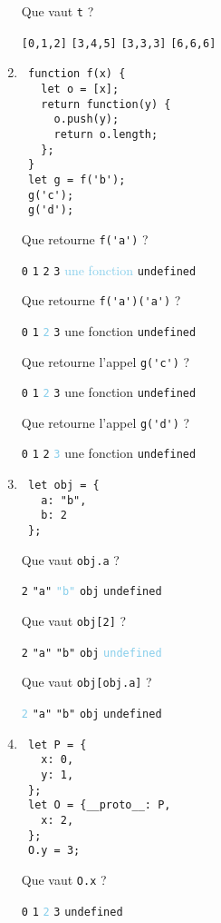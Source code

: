 \documentclass[a4paper, 12pt]{article}
\newcommand{\choice}[1]{\Square\hspace{2pt} #1\hspace{5pt}}
\newcommand{\choicec}[1]{\Square\hspace{2pt} \lstinline{#1}\hspace{5pt}}
\newcommand{\fullpoint}[1]{\textcolor{RubineRed}{#1}}
\newcommand{\halfpoint}[1]{\textcolor{SkyBlue}{#1}}
\newcommand{\choicegh}[1]{\halfpoint{\XBox\hspace{2pt} #1\hspace{5pt}}}
\newcommand{\choicecg}[1]{\fullpoint{\XBox\hspace{2pt} \lstinline{#1}\hspace{5pt}}}
\newcommand{\choicecgh}[1]{\halfpoint{\XBox\hspace{2pt} \lstinline{#1}\hspace{5pt}}}
\begin{document}
\begin{enumerate}
  Que vaut \lstinline{t} ?

  \choicec{[0,1,2]} \choicec{[3,4,5]} \choicec{[3,3,3]} \choicecg{[6,6,6]}

\item \lstset{language=javascript}
\begin{lstlisting}
 function f(x) {
   let o = [x];
   return function(y) {
     o.push(y);
     return o.length;
   };
 }
 let g = f('b');
 g('c');
 g('d');
\end{lstlisting}

  Que retourne \lstinline{f('a')} ?

  \choicec{0} \choicec{1} \choicec{2} \choicec{3} \choicegh{une fonction} \choicec{undefined}

  Que retourne \lstinline{f('a')('a')} ?

  \choicec{0} \choicec{1} \choicecgh{2} \choicec{3} \choice{une fonction} \choicec{undefined}

  Que retourne l'appel \lstinline{g('c')} ?

  \choicec{0} \choicec{1} \choicecgh{2} \choicec{3} \choice{une fonction} \choicec{undefined}

  Que retourne l'appel \lstinline{g('d')} ?

  \choicec{0} \choicec{1} \choicec{2} \choicecgh{3} \choice{une fonction} \choicec{undefined}
\item \lstset{language=javascript}
\begin{lstlisting}
 let obj = {
   a: "b",
   b: 2
 };
\end{lstlisting}

  Que vaut \lstinline{obj.a} ?

  \choicec{2} \choicec{"a"} \choicecgh{"b"} \choicec{obj} \choicec{undefined}

  Que vaut \lstinline{obj[2]} ?

  \choicec{2} \choicec{"a"} \choicec{"b"} \choicec{obj} \choicecgh{undefined}

  Que vaut \lstinline{obj[obj.a]} ?

  \choicecgh{2} \choicec{"a"} \choicec{"b"} \choicec{obj} \choicec{undefined}
\newpage
\item \begin{lstlisting}
 let P = {
   x: 0,
   y: 1,
 };
 let O = {__proto__: P,
   x: 2,
 };
 O.y = 3;
\end{lstlisting}

  Que vaut \lstinline{O.x} ?

  \choicec{0} \choicec{1} \choicecgh{2} \choicec{3} \choicec{undefined}


\end{enumerate}
\end{document}
